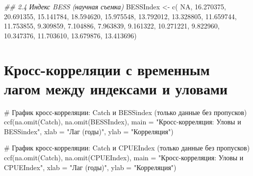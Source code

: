 \documentclass[
  letterpaper,
  DIV=11,
  numbers=noendperiod]{scrreprt}
\newenvironment{Shaded}{\begin{snugshade}}{\end{snugshade}}
\newcommand{\AttributeTok}[1]{\textcolor[rgb]{0.40,0.45,0.13}{#1}}
\newcommand{\CommentTok}[1]{\textcolor[rgb]{0.37,0.37,0.37}{#1}}
\newcommand{\ConstantTok}[1]{\textcolor[rgb]{0.56,0.35,0.01}{#1}}
\newcommand{\DocumentationTok}[1]{\textcolor[rgb]{0.37,0.37,0.37}{\textit{#1}}}
\newcommand{\FloatTok}[1]{\textcolor[rgb]{0.68,0.00,0.00}{#1}}
\newcommand{\FunctionTok}[1]{\textcolor[rgb]{0.28,0.35,0.67}{#1}}
\newcommand{\NormalTok}[1]{\textcolor[rgb]{0.00,0.23,0.31}{#1}}
\newcommand{\OtherTok}[1]{\textcolor[rgb]{0.00,0.23,0.31}{#1}}
\newcommand{\StringTok}[1]{\textcolor[rgb]{0.13,0.47,0.30}{#1}}
\begin{document}
\begin{Shaded}
\begin{Highlighting}[]
\DocumentationTok{\#\# 2.4 Индекс BESS (научная съемка)}
\NormalTok{BESSIndex }\OtherTok{\textless{}{-}} \FunctionTok{c}\NormalTok{( }\ConstantTok{NA}\NormalTok{, }\FloatTok{16.270375}\NormalTok{, }\FloatTok{20.691355}\NormalTok{, }\FloatTok{15.141784}\NormalTok{, }\FloatTok{18.594620}\NormalTok{, }\FloatTok{15.975548}\NormalTok{, }\FloatTok{13.792012}\NormalTok{,}
\FloatTok{13.328805}\NormalTok{, }\FloatTok{11.659744}\NormalTok{, }\FloatTok{11.753855}\NormalTok{,  }\FloatTok{9.309859}\NormalTok{,  }\FloatTok{7.104886}\NormalTok{,  }\FloatTok{7.963839}\NormalTok{,  }\FloatTok{9.161322}\NormalTok{,}
\FloatTok{10.271221}\NormalTok{,  }\FloatTok{9.822960}\NormalTok{, }\FloatTok{10.347376}\NormalTok{, }\FloatTok{11.703610}\NormalTok{, }\FloatTok{13.679876}\NormalTok{, }\FloatTok{13.413696}\NormalTok{)}
\end{Highlighting}
\end{Shaded}

\section{Кросс-корреляции с временным лагом между индексами и
уловами}\label{ux43aux440ux43eux441ux441-ux43aux43eux440ux440ux435ux43bux44fux446ux438ux438-ux441-ux432ux440ux435ux43cux435ux43dux43dux44bux43c-ux43bux430ux433ux43eux43c-ux43cux435ux436ux434ux443-ux438ux43dux434ux435ux43aux441ux430ux43cux438-ux438-ux443ux43bux43eux432ux430ux43cux438}

\begin{Shaded}
\begin{Highlighting}[]
\CommentTok{\# График кросс{-}корреляции: Catch и BESSindex (только данные без пропусков)}
\FunctionTok{ccf}\NormalTok{(}\FunctionTok{na.omit}\NormalTok{(Catch), }\FunctionTok{na.omit}\NormalTok{(BESSIndex),}
    \AttributeTok{main =} \StringTok{"Кросс{-}корреляция: Уловы и BESSindex"}\NormalTok{,}
    \AttributeTok{xlab =} \StringTok{"Лаг (годы)"}\NormalTok{, }\AttributeTok{ylab =} \StringTok{"Корреляция"}\NormalTok{)}


\CommentTok{\# График кросс{-}корреляции: Catch и CPUEIndex (только данные без пропусков)}
\FunctionTok{ccf}\NormalTok{(}\FunctionTok{na.omit}\NormalTok{(Catch), }\FunctionTok{na.omit}\NormalTok{(CPUEIndex),}
    \AttributeTok{main =} \StringTok{"Кросс{-}корреляция: Уловы и CPUEIndex"}\NormalTok{,}
    \AttributeTok{xlab =} \StringTok{"Лаг (годы)"}\NormalTok{, }\AttributeTok{ylab =} \StringTok{"Корреляция"}\NormalTok{)}
\end{Highlighting}
\end{Shaded}
\end{document}
